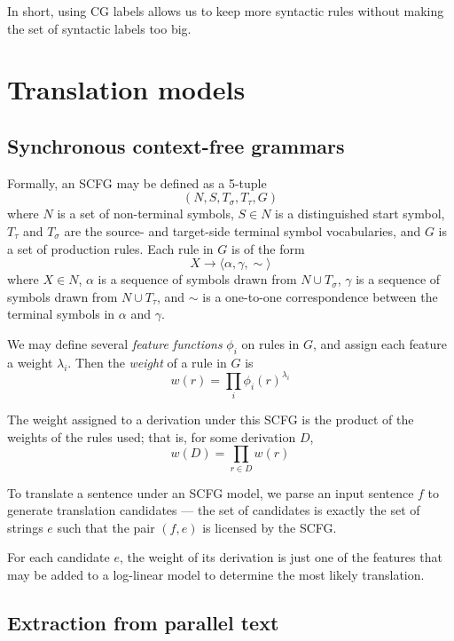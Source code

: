 \documentclass[a4paper]{article}
\begin{document}
In short, using CG labels allows us to keep more syntactic rules without making the set of syntactic labels too big.

\section{Translation models}

\subsection{Synchronous context-free grammars}

Formally, an SCFG may be defined as a 5-tuple
$$(N,S,T_\sigma,T_\tau,G)$$
where $N$ is a set of non-terminal symbols, $S \in N$ is a distinguished start symbol, $T_\tau$ and $T_\sigma$ are the source- and target-side terminal symbol vocabularies, and $G$ is a set of production rules. Each rule in $G$ is of the form
$$X \to \langle \alpha, \gamma, \sim \rangle$$
where $X \in N$, $\alpha$ is a sequence of symbols drawn from $N \cup T_\sigma$, $\gamma$ is a sequence of symbols drawn from $N \cup T_\tau$, and $\sim$ is a one-to-one correspondence between the terminal symbols in $\alpha$ and $\gamma$.

We may define several {\em feature functions} $\phi_i$ on rules in $G$, and assign each feature a weight $\lambda_i$. Then the {\em weight} of a rule in $G$ is
\begin{equation}
w(r) = \prod_i{\phi_i(r)^{\lambda_i}}
\end{equation}

The weight assigned to a derivation under this SCFG is the product of the weights of the rules used; that is, for some derivation $D$,
\begin{equation}
w(D) = \prod_{r \in D}{w(r)}
\end{equation}

To translate a sentence under an SCFG model, we parse an input sentence $f$ to generate translation candidates --- the set of candidates is exactly the set of strings $e$ such that the pair $(f,e)$ is licensed by the SCFG.

For each candidate $e$, the weight of its derivation is just one of the features that may be added to a log-linear model to determine the most likely translation.

\subsection{Extraction from parallel text}
\end{document}
